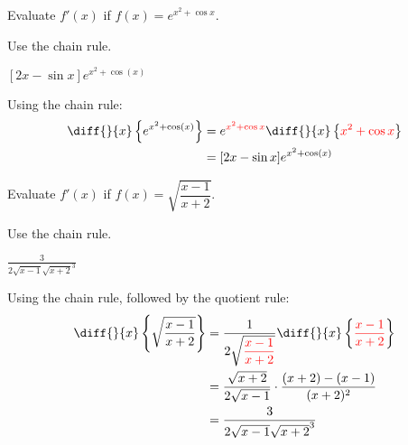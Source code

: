 \begin{question}[2009H]
Evaluate $f'(x)$ if $f(x) = e^{x^2+\cos x}$.
\end{question}
\begin{hint}
Use the chain rule.
\end{hint}
\begin{answer}
$[2x-\sin x]e^{x^2+\cos(x)}$
\end{answer}
\begin{solution}
Using the chain rule:
\begin{align*}
\diff{}{x}\left\{e^{x^2+\cos(x)}\right\}&=e^{\textcolor{red}{x^2+\cos x}}\diff{}{x}\left\{
\textcolor{red}{x^2+\cos x}\right\}
\\&=[2x-\sin x]e^{x^2+\cos(x)}
\end{align*}
\end{solution}

\begin{question}[2009H]
Evaluate $f'(x)$ if $f(x) = \sqrt{\dfrac{x-1}{x+2}}$.
\end{question}
\begin{hint}
Use the chain rule.
\end{hint}
\begin{answer}
$\frac{3}{2\sqrt{x-1}\sqrt{x+2}^3}$
\end{answer}
\begin{solution}
Using the chain rule, followed by the quotient rule:
\begin{align*}
\diff{}{x}\left\{ \sqrt{\dfrac{x-1}{x+2}}\right\}&=\frac{1}{2\sqrt{\textcolor{red}{\dfrac{x-1}{x+2}}}}\diff{}{x}\left\{
\textcolor{red}{\dfrac{x-1}{x+2}}\right\}
\\&=\frac{\sqrt{x+2}}{2\sqrt{x-1}}\cdot \frac{(x+2)-(x-1)}{(x+2)^2}\\
&=\frac{3}{2\sqrt{x-1}\sqrt{x+2}^3}
\end{align*}
\end{solution}

